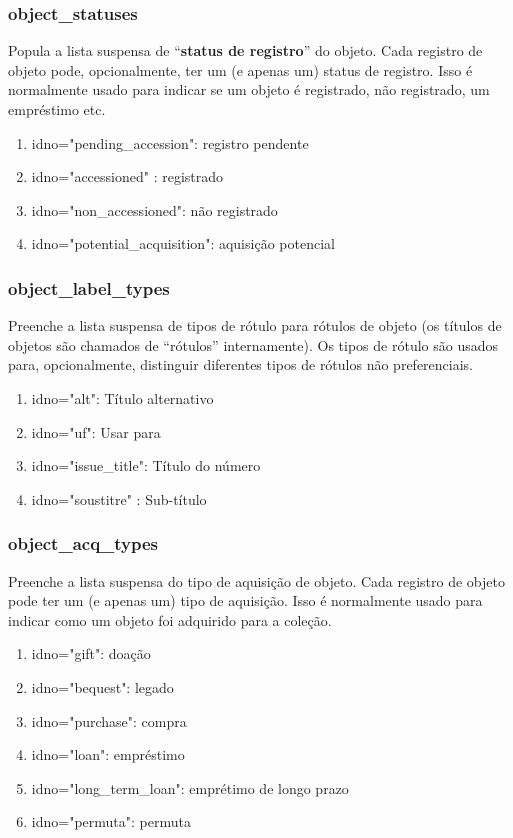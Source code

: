 \subsubsection{object\_statuses}
Popula a lista suspensa de ``\textbf{status de registro}'' do objeto. Cada registro de objeto pode, opcionalmente, ter um (e apenas um) status de registro. Isso é normalmente usado para indicar se um objeto é registrado, não registrado, um empréstimo etc.
\begin{enumerate}
	\item idno="pending\_accession": registro pendente
	\item idno="accessioned" : registrado
	\item idno="non\_accessioned": não registrado
	\item idno="potential\_acquisition": aquisição potencial
\end{enumerate}

\subsubsection{object\_label\_types}
Preenche a lista suspensa de tipos de rótulo para rótulos de objeto (os títulos de objetos são chamados de ``rótulos'' internamente). Os tipos de rótulo são usados para, opcionalmente, distinguir diferentes tipos de rótulos não preferenciais. 

\begin{enumerate}
	\item idno="alt": Título alternativo
	\item idno="uf": Usar para
	\item idno="issue\_title": Título do número
	\item idno="soustitre" : Sub-título
\end{enumerate}

\subsubsection{object\_acq\_types}

Preenche a lista suspensa do tipo de aquisição de objeto. Cada registro de objeto pode ter um (e apenas um) tipo de aquisição. Isso é normalmente usado para indicar como um objeto foi adquirido para a coleção.

\begin{enumerate}
	\item idno="gift": doação
	\item idno="bequest": legado
	\item idno="purchase": compra
	\item idno="loan": empréstimo
	\item idno="long\_term\_loan": emprétimo de longo prazo
	\item idno="permuta": permuta
\end{enumerate}

